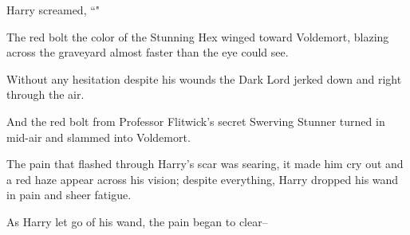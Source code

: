 Harry screamed, ``"

The red bolt the color of the Stunning Hex winged toward Voldemort, blazing across the graveyard almost faster than the eye could see.

Without any hesitation despite his wounds the Dark Lord jerked down and right through the air.

And the red bolt from Professor Flitwick's secret Swerving Stunner turned in mid-air and slammed into Voldemort.

The pain that flashed through Harry's scar was searing, it made him cry out and a red haze appear across his vision; despite everything, Harry dropped his wand in pain and sheer fatigue.

As Harry let go of his wand, the pain began to clear\---

